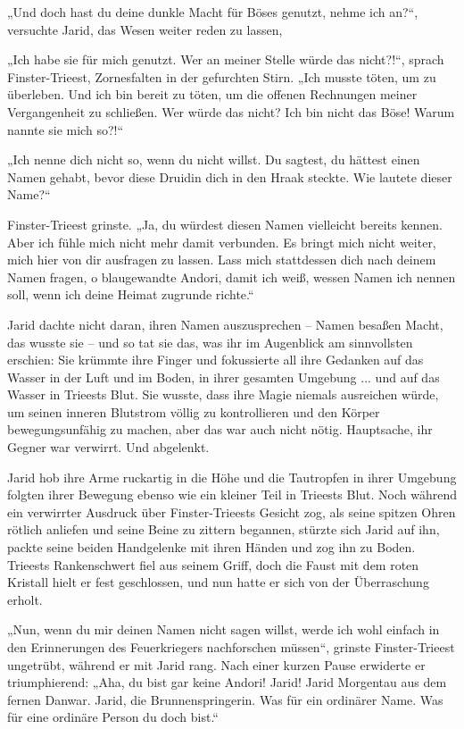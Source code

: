 „Und doch hast du deine dunkle Macht für Böses genutzt, nehme ich an?“, versuchte Jarid, das Wesen weiter reden zu lassen,

„Ich habe sie für mich genutzt. Wer an meiner Stelle würde das nicht?!“, sprach Finster-Trieest, Zornesfalten in der gefurchten Stirn. „Ich musste töten, um zu überleben. Und ich bin bereit zu töten, um die offenen Rechnungen meiner Vergangenheit zu schließen. Wer würde das nicht? Ich bin nicht das Böse! Warum nannte sie mich so?!“

„Ich nenne dich nicht so, wenn du nicht willst. Du sagtest, du hättest einen Namen gehabt, bevor diese Druidin dich in den Hraak steckte. Wie lautete dieser Name?“

Finster-Trieest grinste. „Ja, du würdest diesen Namen vielleicht bereits kennen. Aber ich fühle mich nicht mehr damit verbunden. Es bringt mich nicht weiter, mich hier von dir ausfragen zu lassen. Lass mich stattdessen dich nach deinem Namen fragen, o blaugewandte Andori, damit ich weiß, wessen Namen ich nennen soll, wenn ich deine Heimat zugrunde richte.“

Jarid dachte nicht daran, ihren Namen auszusprechen – Namen besaßen Macht, das wusste sie – und so tat sie das, was ihr im Augenblick am sinnvollsten erschien: Sie krümmte ihre Finger und fokussierte all ihre Gedanken auf das Wasser in der Luft und im Boden, in ihrer gesamten Umgebung ... und auf das Wasser in Trieests Blut. Sie wusste, dass ihre Magie niemals ausreichen würde, um seinen inneren Blutstrom völlig zu kontrollieren und den Körper bewegungsunfähig zu machen, aber das war auch nicht nötig. Hauptsache, ihr Gegner war verwirrt. Und abgelenkt.

Jarid hob ihre Arme ruckartig in die Höhe und die Tautropfen in ihrer Umgebung folgten ihrer Bewegung ebenso wie ein kleiner Teil in Trieests Blut. Noch während ein verwirrter Ausdruck über Finster-Trieests Gesicht zog, als seine spitzen Ohren rötlich anliefen und seine Beine zu zittern begannen, stürzte sich Jarid auf ihn, packte seine beiden Handgelenke mit ihren Händen und zog ihn zu Boden. Trieests Rankenschwert fiel aus seinem Griff, doch die Faust mit dem roten Kristall hielt er fest geschlossen, und nun hatte er sich von der Überraschung erholt.

„Nun, wenn du mir deinen Namen nicht sagen willst, werde ich wohl einfach in den Erinnerungen des Feuerkriegers nachforschen müssen“, grinste Finster-Trieest ungetrübt, während er mit Jarid rang. Nach einer kurzen Pause erwiderte er triumphierend: „Aha, du bist gar keine Andori! Jarid! Jarid Morgentau aus dem fernen Danwar. Jarid, die Brunnenspringerin. Was für ein ordinärer Name. Was für eine ordinäre Person du doch bist.“

